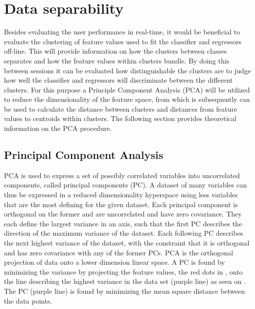 \section{Data separability} \label{sec:dataSeparability}
Besides evaluating the user performance in real-time, it would be beneficial to evaluate the clustering of feature values used to fit the classifier and regressors off-line. This will provide information on how the clusters between classes separates and how the feature values within clusters bundle. %
By doing this between sessions it can be evaluated how distinguishable the clusters are to judge how well the classifier and regressors will discriminate between the different clusters. For this purpose a Principle Component Analysis (PCA) will be utilized to reduce the dimensionality of the feature space, from which is subsequently can be used to calculate the distance between clusters and distances from feature values to centroids within clusters. The following section provides theoretical information on the PCA procedure. 


\subsection{Principal Component Analysis} \label{sub:PCA}
PCA is used to express a set of possibly correlated variables into uncorrelated components, called principal components (PC). A dataset of many variables can thus be expressed in a reduced dimensionality hyperspace using less variables that are the most defining for the given dataset. Each principal component is orthogonal on the former and are uncorrelated and have zero covariance. They each define the largest variance in an axis, such that the first PC describes the direction of the maximum variance of the dataset. Each following PC describes the next highest variance of the dataset, with the constraint that it is orthogonal and has zero covariance with any of the former PCs. \cite{Semmlow2014}
PCA is the orthogonal projection of data onto a lower dimension linear space. A PC is found by minimizing the variance by projecting the feature values, the red dots in , onto the line describing the highest variance in the data set (purple line) as seen on . The PC (purple line) is found by minimizing the mean square distance between the data points. \cite{Semmlow2014}


